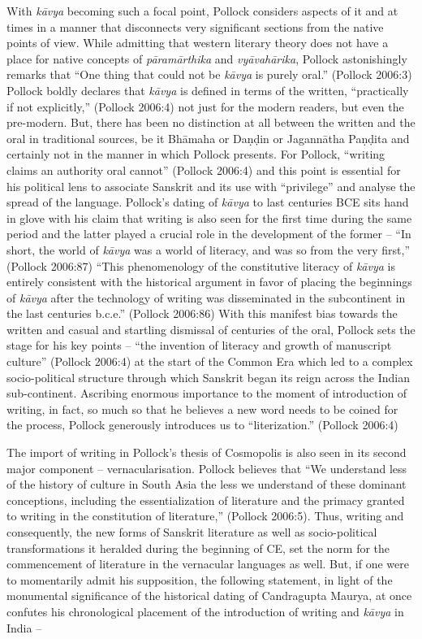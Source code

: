 With \textit{kāvya} becoming such a focal point, Pollock considers aspects of it and at times in a manner that disconnects very significant sections from the native points of view. While admitting that western literary theory does not have a place for native concepts of \textit{pāramārthika} and \textit{vyāvahārika}, Pollock astonishingly remarks that “One thing that could not be \textit{kāvya} is purely oral.” (Pollock 2006:3) Pollock boldly declares that \textit{kāvya} is defined in terms of the written, “practically if not explicitly,” (Pollock 2006:4) not just for the modern readers, but even the pre-modern. But, there has been no distinction at all between the written and the oral in traditional sources, be it Bhāmaha or Daṇḍin or Jagannātha Paṇḍita and certainly not in the manner in which Pollock presents. For Pollock, “writing claims an authority oral cannot” (Pollock 2006:4) and this point is essential for his political lens to associate Sanskrit and its use with “privilege” and analyse the spread of the language. Pollock’s dating of \textit{kāvya} to last centuries BCE sits hand in glove with his claim that writing is also seen for the first time during the same period and the latter played a crucial role in the development of the former – “In short, the world of \textit{kāvya} was a world of literacy, and was so from the very first,” (Pollock 2006:87) “This phenomenology of the constitutive literacy of \textit{kāvya} is entirely consistent with the historical argument in favor of placing the beginnings of \textit{kāvya} after the technology of writing was disseminated in the subcontinent in the last centuries b.c.e.” (Pollock 2006:86) With this manifest bias towards the written and casual and startling dismissal of centuries of the oral, Pollock sets the stage for his key points – “the invention of literacy and growth of manuscript culture” (Pollock 2006:4) at the start of the Common Era which led to a complex socio-political structure through which Sanskrit began its reign across the Indian sub-continent. Ascribing enormous importance to the moment of introduction of writing, in fact, so much so that he believes a new word needs to be coined for the process, Pollock generously introduces us to “literization.” (Pollock 2006:4)

\newpage

The import of writing in Pollock’s thesis of Cosmopolis is also seen in its second major component – vernacularisation. Pollock believes that “We understand less of the history of culture in South Asia the less we understand of these dominant conceptions, including the essentialization of literature and the primacy granted to writing in the constitution of literature,” (Pollock 2006:5). Thus, writing and consequently, the new forms of Sanskrit literature as well as socio-political transformations it heralded during the beginning of CE, set the norm for the commencement of literature in the vernacular languages as well. But, if one were to momentarily admit his supposition, the following statement, in light of the monumental significance of the historical dating of Candragupta Maurya, at once confutes his chronological placement of the introduction of writing and \textit{kāvya} in India –

